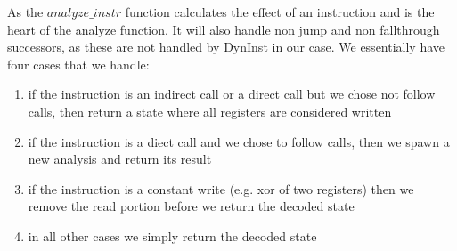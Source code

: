 
As the $analyze\_instr$ function calculates the effect of an instruction and is the heart of the analyze function. It will also handle non jump and non fallthrough successors, as these are not handled by DynInst in our case. We essentially have four cases that we handle:
\begin{enumerate}
\item if the instruction is an indirect call or a direct call but we chose not follow calls, then return a state where all registers are considered written
\item if the instruction is a diect call and we chose to follow calls, then we spawn a new analysis and return its result 
\item if the instruction is a constant write (e.g. xor of two registers) then we remove the read portion before we return the decoded state
\item in all other cases we simply return the decoded state
\end{enumerate}

